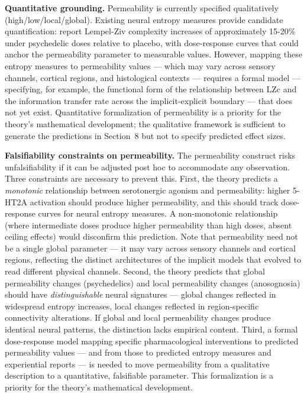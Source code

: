 \documentclass[12pt]{article}
\newcommand{\revstart}{}
\newcommand{\revend}{}
\begin{document}
\begin{sloppypar}
\textbf{Quantitative grounding.} Permeability is currently specified qualitatively (high/low/local/global). Existing neural entropy measures provide candidate quantification: \citet{Schartner2017} report Lempel-Ziv complexity increases of approximately 15-20\% under psychedelic doses relative to placebo, with dose-response curves that could anchor the permeability parameter to measurable values. However, mapping these entropy measures to permeability values --- which may vary across sensory channels, cortical regions, and histological contexts --- requires a formal model --- specifying, for example, the functional form of the relationship between LZc and the information transfer rate across the implicit-explicit boundary --- that does not yet exist. Quantitative formalization of permeability is a priority for the theory's mathematical development; the qualitative framework is sufficient to generate the predictions in Section~8 but not to specify predicted effect sizes.
\end{sloppypar}

{\revstart\textbf{Falsifiability constraints on permeability.} The permeability construct risks unfalsifiability if it can be adjusted post hoc to accommodate any observation. Three constraints are necessary to prevent this. First, the theory predicts a \emph{monotonic} relationship between serotonergic agonism and permeability: higher 5-HT2A activation should produce higher permeability, and this should track dose-response curves for neural entropy measures. A non-monotonic relationship (where intermediate doses produce higher permeability than high doses, absent ceiling effects) would disconfirm this prediction. Note that permeability need not be a single global parameter --- it may vary across sensory channels and cortical regions, reflecting the distinct architectures of the implicit models that evolved to read different physical channels. Second, the theory predicts that global permeability changes (psychedelics) and local permeability changes (anosognosia) should have \emph{distinguishable} neural signatures --- global changes reflected in widespread entropy increases, local changes reflected in region-specific connectivity alterations. If global and local permeability changes produce identical neural patterns, the distinction lacks empirical content. Third, a formal dose-response model mapping specific pharmacological interventions to predicted permeability values --- and from those to predicted entropy measures and experiential reports --- is needed to move permeability from a qualitative description to a quantitative, falsifiable parameter. This formalization is a priority for the theory's mathematical development.\revend}
\end{document}
